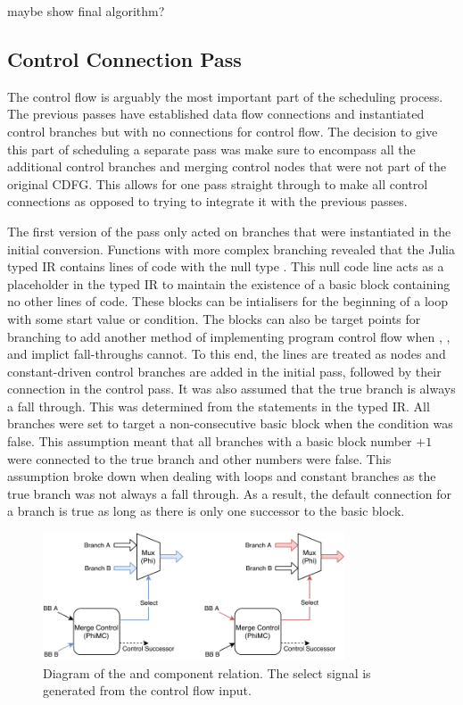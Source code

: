maybe show final algorithm? %
\fi


\subsection{Control Connection Pass}
The control flow is arguably the most important part of the scheduling process. The previous passes have established data flow connections and instantiated control branches but with no connections for control flow. The decision to give this part of scheduling a separate pass was make sure to encompass all the additional control branches and merging control nodes that were not part of the original CDFG. This allows for one pass straight through to make all control connections as opposed to trying to integrate it with the previous passes. 

The first version of the pass only acted on branches that were instantiated in the initial conversion. Functions with more complex branching revealed that the Julia typed IR contains lines of code with the null type . This null code line acts as a placeholder in the typed IR to maintain the existence of a basic block containing no other lines of code. These blocks can be intialisers for the beginning of a loop with some start value or condition. The blocks can also be target points for branching to add another method of implementing program control flow when , , and implict fall-throughs cannot. To this end, the  lines are treated as  nodes and constant-driven control branches are added in the initial pass, followed by their connection in the control pass. It was also assumed that the true branch is always a fall through. This was determined from the  statements in the typed IR. All branches were set to target a non-consecutive basic block when the condition was false. This assumption meant that all branches with a basic block number $+1$ were connected to the true branch and other numbers were false. This assumption broke down when dealing with loops and constant branches as the true branch was not always a fall through. As a result, the default connection for a branch is true as long as there is only one successor to the basic block.

\begin{figure}[htb!]
    \centering
    \includegraphics[width=0.8\textwidth]{Images/mux_mc_exp.pdf}
    \caption{Diagram of the  and  component relation. The select signal is generated from the control flow input.}
    \label{fig:mux_mc}
\end{figure}

